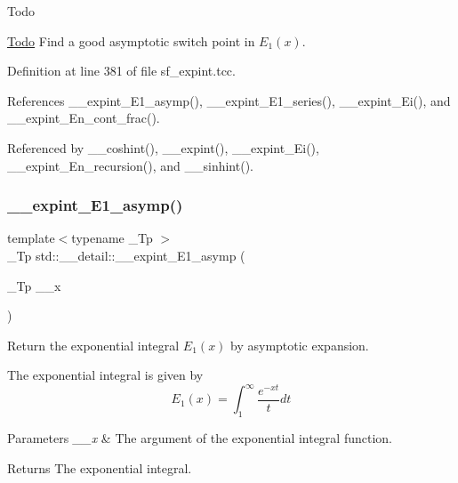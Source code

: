 \begin{DoxyRefDesc}{Todo}
\item[\hyperlink{todo__todo000010}{Todo}]Find a good asymptotic switch point in $ E_1(x) $. \end{DoxyRefDesc}


Definition at line 381 of file sf\+\_\+expint.\+tcc.



References \+\_\+\+\_\+expint\+\_\+\+E1\+\_\+asymp(), \+\_\+\+\_\+expint\+\_\+\+E1\+\_\+series(), \+\_\+\+\_\+expint\+\_\+\+Ei(), and \+\_\+\+\_\+expint\+\_\+\+En\+\_\+cont\+\_\+frac().



Referenced by \+\_\+\+\_\+coshint(), \+\_\+\+\_\+expint(), \+\_\+\+\_\+expint\+\_\+\+Ei(), \+\_\+\+\_\+expint\+\_\+\+En\+\_\+recursion(), and \+\_\+\+\_\+sinhint().

\mbox{\label{namespacestd_1_1____detail_abd02a300cd209be618a6e054a706c012}} 
\subsubsection{\texorpdfstring{\+\_\+\+\_\+expint\+\_\+\+E1\+\_\+asymp()}{\_\_expint\_E1\_asymp()}}
{\footnotesize\ttfamily template$<$typename \+\_\+\+Tp $>$ \\
\+\_\+\+Tp std\+::\+\_\+\+\_\+detail\+::\+\_\+\+\_\+expint\+\_\+\+E1\+\_\+asymp (\begin{DoxyParamCaption}\item[{\+\_\+\+Tp}]{\+\_\+\+\_\+x }\end{DoxyParamCaption})}



Return the exponential integral $ E_1(x) $ by asymptotic expansion. 

The exponential integral is given by \[ E_1(x) = \int_{1}^\infty \frac{e^{-xt}}{t} dt \]


\begin{DoxyParams}{Parameters}
{\em \+\_\+\+\_\+x} & The argument of the exponential integral function. \\
\hline
\end{DoxyParams}
\begin{DoxyReturn}{Returns}
The exponential integral. 
\end{DoxyReturn}



